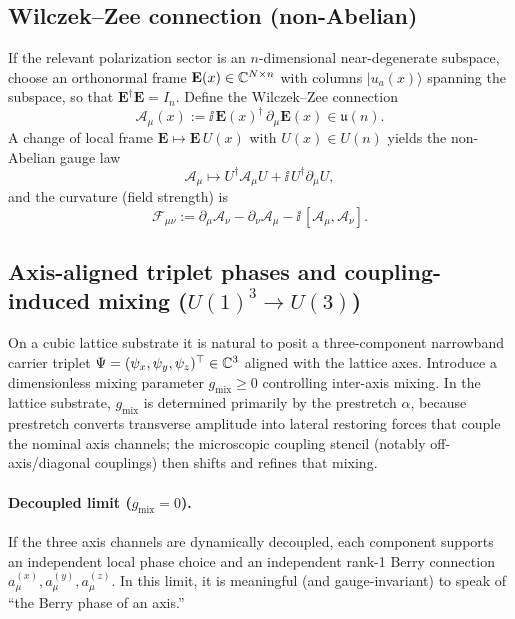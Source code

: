 \subsection{Wilczek--Zee connection (non-Abelian)}

If the relevant polarization sector is an $n$-dimensional near-degenerate subspace, choose an orthonormal
frame $\mathbf{E}(x)\in\mathbb{C}^{N\times n}$ with columns $\lvert u_a(x)\rangle$ spanning the subspace, so that
$\mathbf{E}^\dagger\mathbf{E}=I_n$.
Define the Wilczek--Zee connection
\begin{equation}
  \mathcal{A}_\mu(x) := \ii\,\mathbf{E}(x)^\dagger\,\partial_\mu \mathbf{E}(x)\in\mathfrak{u}(n).
  \label{eq:wz-connection}
\end{equation}
A change of local frame $\mathbf{E}\mapsto \mathbf{E}\,U(x)$ with $U(x)\in U(n)$ yields the non-Abelian gauge law
\begin{equation}
  \mathcal{A}_\mu \mapsto U^\dagger \mathcal{A}_\mu U + \ii\,U^\dagger \partial_\mu U,
  \label{eq:wz-gauge}
\end{equation}
and the curvature (field strength) is
\begin{equation}
  \mathcal{F}_{\mu\nu}
  := \partial_\mu \mathcal{A}_\nu-\partial_\nu \mathcal{A}_\mu
     -\ii\,[\mathcal{A}_\mu,\mathcal{A}_\nu].
  \label{eq:wz-curvature}
\end{equation}

\subsection{Axis-aligned triplet phases and coupling-induced mixing ($U(1)^3\rightarrow U(3)$)}
\label{subsec:axis-triplet}

On a cubic lattice substrate it is natural to posit a three-component narrowband carrier triplet
$\Psi=(\psi_x,\psi_y,\psi_z)^\top\in\mathbb{C}^3$ aligned with the lattice axes.
Introduce a dimensionless mixing parameter $g_{\mathrm{mix}}\ge 0$ controlling inter-axis mixing.
In the lattice substrate, $g_{\mathrm{mix}}$ is determined primarily by the prestretch $\alpha$, because prestretch converts transverse amplitude into lateral restoring forces that couple the nominal axis channels; the microscopic coupling stencil (notably off-axis/diagonal couplings) then shifts and refines that mixing.

\paragraph{Decoupled limit ($g_{\mathrm{mix}}=0$).}
If the three axis channels are dynamically decoupled, each component supports an independent local phase choice
and an independent rank-1 Berry connection $a_\mu^{(x)},a_\mu^{(y)},a_\mu^{(z)}$.
In this limit, it is meaningful (and gauge-invariant) to speak of ``the Berry phase of an axis.''

